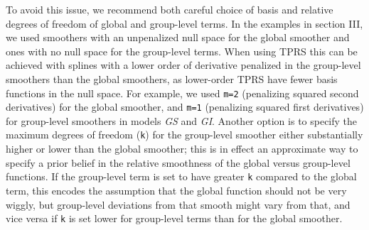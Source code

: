 \documentclass[12pt]{article}
\begin{document}
To avoid this issue, we recommend both careful choice of basis and
relative degrees of freedom of global and group-level terms. In the
examples in section III, we used smoothers with an unpenalized null
space for the global smoother and ones with no null space for the
group-level terms. When using TPRS this can be achieved with splines
with a lower order of derivative penalized in the group-level smoothers
than the global smoothers, as lower-order TPRS have fewer basis
functions in the null space. For example, we used \texttt{m=2}
(penalizing squared second derivatives) for the global smoother, and
\texttt{m=1} (penalizing squared first derivatives) for group-level
smoothers in models \emph{GS} and \emph{GI}. Another option is to
specify the maximum degrees of freedom (\texttt{k}) for the group-level
smoother either substantially higher or lower than the global smoother;
this is in effect an approximate way to specify a prior belief in the
relative smoothness of the global versus group-level functions. If the
group-level term is set to have greater \texttt{k} compared to the
global term, this encodes the assumption that the global function should
not be very wiggly, but group-level deviations from that smooth might
vary from that, and vice versa if \texttt{k} is set lower for
group-level terms than for the global smoother.
\end{document}
